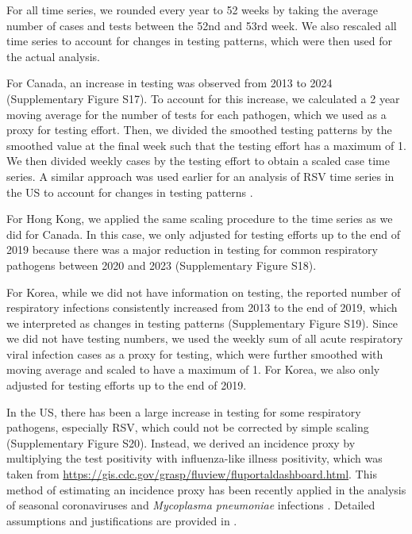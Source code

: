\documentclass[12pt]{article}
\begin{document}
For all time series, we rounded every year to 52 weeks by taking the average number of cases and tests between the 52nd and 53rd week.
We also rescaled all time series to account for changes in testing patterns, which were then used for the actual analysis.

For Canada, an increase in testing was observed from 2013 to 2024 (Supplementary Figure S17).
To account for this increase, we calculated a 2 year moving average for the number of tests for each pathogen, which we used as a proxy for testing effort.
Then, we divided the smoothed testing patterns by the smoothed value at the final week such that the testing effort has a maximum of 1.
We then divided weekly cases by the testing effort to obtain a scaled case time series.
A similar approach was used earlier for an analysis of RSV time series in the US to account for changes in testing patterns \citep{pitzer2015environmental}.

For Hong Kong, we applied the same scaling procedure to the time series as we did for Canada.
In this case, we only adjusted for testing efforts up to the end of 2019 because there was a major reduction in testing for common respiratory pathogens between 2020 and 2023 (Supplementary Figure S18).

For Korea, while we did not have information on testing, the reported number of respiratory infections consistently increased from 2013 to the end of 2019, which we interpreted as changes in testing patterns (Supplementary Figure S19).
Since we did not have testing numbers, we used the weekly sum of all acute respiratory viral infection cases as a proxy for testing, which were further smoothed with moving average and scaled to have a maximum of 1.
For Korea, we also only adjusted for testing efforts up to the end of 2019.

In the US, there has been a large increase in testing for some respiratory pathogens, especially RSV, which could not be corrected by simple scaling (Supplementary Figure S20).
Instead, we derived an incidence proxy by multiplying the test positivity with influenza-like illness positivity, which was taken from \url{https://gis.cdc.gov/grasp/fluview/fluportaldashboard.html}.
This method of estimating an incidence proxy has been recently applied in the analysis of seasonal coronaviruses \citep{kissler2020projecting} and \textit{Mycoplasma pneumoniae} infections \citep{park2024predicting}.
Detailed assumptions and justifications are provided in \citep{goldstein2011predicting}.
\end{document}
